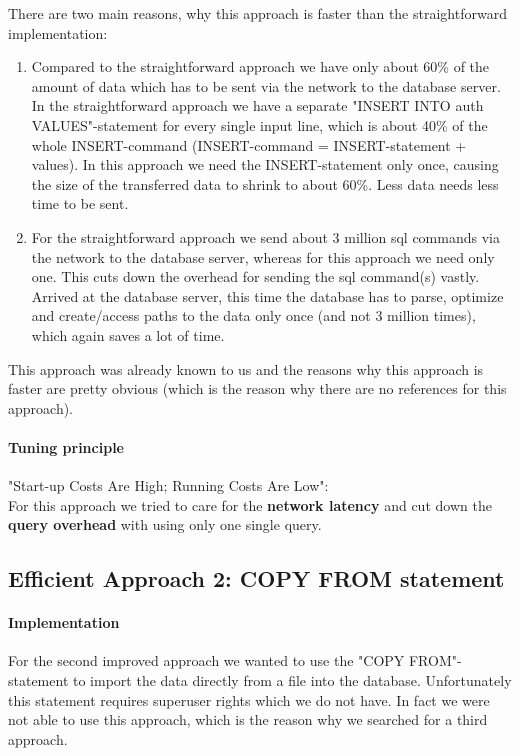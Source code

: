 \documentclass[11pt]{scrartcl}
\begin{document}
  There are two main reasons, why this approach is faster than the straightforward implementation:
  \begin{enumerate}
  	\item Compared to the straightforward approach we have only about 60\% of the amount of data which has to be sent via the network to the database server. In the straightforward approach we have a separate "INSERT INTO auth VALUES"-statement for every single input line, which is about 40\% of the whole INSERT-command (INSERT-command = INSERT-statement + values). In this approach we need the INSERT-statement only once, causing the size of the transferred data to shrink to about 60\%. Less data needs less time to be sent.
    \item For the straightforward approach we send about 3 million sql commands via the network to the database server, whereas for this approach we need only one. This cuts down the overhead for sending the sql command(s) vastly. Arrived at the database server, this time the database has to parse, optimize and create/access paths to the data only once (and not 3 million times), which again saves a lot of time.
  \end{enumerate}
This approach was already known to us and the reasons why this approach is faster are pretty obvious (which is the reason why there are no references for this approach).

  \paragraph{Tuning principle}

  "Start-up Costs Are High; Running Costs Are Low":
  \\
  For this approach we tried to care for the \textbf{network latency} and cut down the \textbf{query overhead} with using only one single query.

  \subsection*{Efficient Approach 2: COPY FROM statement}

\paragraph{Implementation}

For the second improved approach we wanted to use the "COPY FROM"-statement to import the data directly from a file into the database. Unfortunately this statement requires superuser rights which we do not have. In fact we were not able to use this approach, which is the reason why we searched for a third approach.
\end{document}
